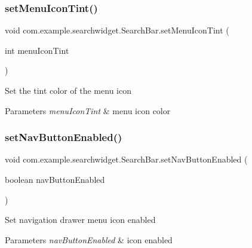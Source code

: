 \subsubsection{\texorpdfstring{setMenuIconTint()}{setMenuIconTint()}}
{\footnotesize\ttfamily void com.\+example.\+searchwidget.\+Search\+Bar.\+set\+Menu\+Icon\+Tint (\begin{DoxyParamCaption}\item[{int}]{menu\+Icon\+Tint }\end{DoxyParamCaption})}

Set the tint color of the menu icon


\begin{DoxyParams}{Parameters}
{\em menu\+Icon\+Tint} & menu icon color \\
\hline
\end{DoxyParams}
\mbox{\label{classcom_1_1example_1_1searchwidget_1_1_search_bar_a4ad3a854a853a3f990f493b053ba8297}} 
\subsubsection{\texorpdfstring{setNavButtonEnabled()}{setNavButtonEnabled()}}
{\footnotesize\ttfamily void com.\+example.\+searchwidget.\+Search\+Bar.\+set\+Nav\+Button\+Enabled (\begin{DoxyParamCaption}\item[{boolean}]{nav\+Button\+Enabled }\end{DoxyParamCaption})}

Set navigation drawer menu icon enabled


\begin{DoxyParams}{Parameters}
{\em nav\+Button\+Enabled} & icon enabled \\
\hline
\end{DoxyParams}
\mbox{\label{classcom_1_1example_1_1searchwidget_1_1_search_bar_a9bfe579751743d32b1008418c6787142}} 
